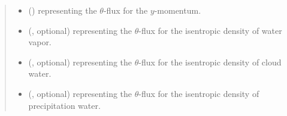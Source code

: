 \documentclass[letterpaper,10pt,english]{sphinxmanual}
\begin{document}
\begin{fulllineitems}
\begin{fulllineitems}
\begin{quote}
\begin{description}
\begin{itemize}
\item {} 
 () \textendash{}  representing the \(\theta\)-flux for the \(y\)-momentum.

\item {} 
 (, optional) \textendash{}  representing the \(\theta\)-flux for the isentropic density of water vapor.

\item {} 
 (, optional) \textendash{}  representing the \(\theta\)-flux for the isentropic density of cloud water.

\item {} 
 (, optional) \textendash{}  representing the \(\theta\)-flux for the isentropic density of precipitation water.

\end{itemize}


\end{description}\end{quote}

\end{fulllineitems}


\end{fulllineitems}

\end{document}
